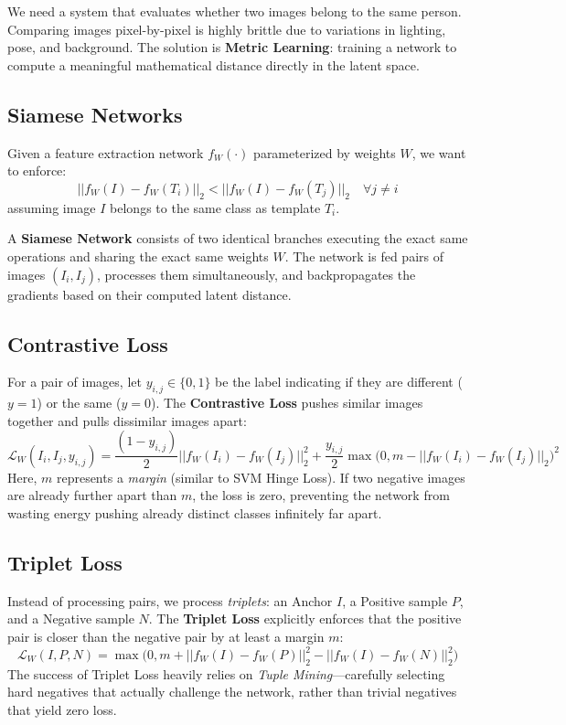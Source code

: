 We need a system that evaluates whether two images belong to the same person. Comparing images pixel-by-pixel is highly brittle due to variations in lighting, pose, and background. The solution is \textbf{Metric Learning}: training a network to compute a meaningful mathematical distance directly in the latent space.

\subsection{Siamese Networks}
Given a feature extraction network $f_W(\cdot)$ parameterized by weights $W$, we want to enforce:
\begin{equation}
    || f_W(I) - f_W(T_i) ||_2 < || f_W(I) - f_W(T_j) ||_2 \quad \forall j \neq i
\end{equation}
assuming image $I$ belongs to the same class as template $T_i$.

A \textbf{Siamese Network} consists of two identical branches executing the exact same operations and sharing the exact same weights $W$. The network is fed pairs of images $(I_i, I_j)$, processes them simultaneously, and backpropagates the gradients based on their computed latent distance.

\subsection{Contrastive Loss}
For a pair of images, let $y_{i,j} \in \{0, 1\}$ be the label indicating if they are different ($y=1$) or the same ($y=0$). The \textbf{Contrastive Loss} pushes similar images together and pulls dissimilar images apart:
\begin{equation}
    \mathcal{L}_W(I_i, I_j, y_{i,j}) = \frac{(1 - y_{i,j})}{2} || f_W(I_i) - f_W(I_j) ||_2^2 + \frac{y_{i,j}}{2} \max\Big(0, m - || f_W(I_i) - f_W(I_j) ||_2\Big)^2
\end{equation}
Here, $m$ represents a \textit{margin} (similar to SVM Hinge Loss). If two negative images are already further apart than $m$, the loss is zero, preventing the network from wasting energy pushing already distinct classes infinitely far apart.

\subsection{Triplet Loss}
Instead of processing pairs, we process \textit{triplets}: an Anchor $I$, a Positive sample $P$, and a Negative sample $N$. The \textbf{Triplet Loss} explicitly enforces that the positive pair is closer than the negative pair by at least a margin $m$:
\begin{equation}
    \mathcal{L}_W(I, P, N) = \max\Big(0, m + || f_W(I) - f_W(P) ||_2^2 - || f_W(I) - f_W(N) ||_2^2\Big)
\end{equation}
The success of Triplet Loss heavily relies on \textit{Tuple Mining}—carefully selecting hard negatives that actually challenge the network, rather than trivial negatives that yield zero loss.

